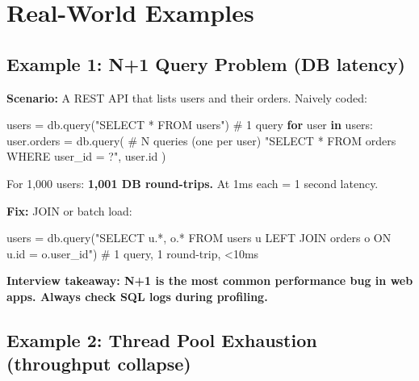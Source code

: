\documentclass[11pt]{article}
\newenvironment{Shaded}{\begin{snugshade}}{\end{snugshade}}
\newcommand{\BuiltInTok}[1]{\textcolor[rgb]{0.50,0.55,0.55}{#1}}
\newcommand{\CommentTok}[1]{\textcolor[rgb]{0.48,0.49,0.49}{#1}}
\newcommand{\ControlFlowTok}[1]{\textcolor[rgb]{0.99,0.74,0.29}{\textbf{#1}}}
\newcommand{\KeywordTok}[1]{\textcolor[rgb]{0.81,0.81,0.76}{\textbf{#1}}}
\newcommand{\NormalTok}[1]{\textcolor[rgb]{0.81,0.81,0.76}{#1}}
\newcommand{\OperatorTok}[1]{\textcolor[rgb]{0.81,0.81,0.76}{#1}}
\newcommand{\StringTok}[1]{\textcolor[rgb]{0.96,0.31,0.31}{#1}}
\begin{document}
\section{Real-World Examples}\label{real-world-examples}

\subsection{Example 1: N+1 Query Problem (DB latency)}\label{example-1-n1-query-problem-db-latency}

\textbf{Scenario:} A REST API that lists users and their orders. Naively coded:


\begin{Shaded}
\begin{Highlighting}[]
\NormalTok{users }\OperatorTok{=}\NormalTok{ db.query(}\StringTok{"SELECT * FROM users"}\NormalTok{)          }\CommentTok{\# 1 query}
\ControlFlowTok{for}\NormalTok{ user }\KeywordTok{in}\NormalTok{ users:}
\NormalTok{    user.orders }\OperatorTok{=}\NormalTok{ db.query(                       }\CommentTok{\# N queries (one per user)}
        \StringTok{"SELECT * FROM orders WHERE user\_id = ?"}\NormalTok{,}
\NormalTok{        user.}\BuiltInTok{id}
\NormalTok{    )}
\end{Highlighting}
\end{Shaded}

For 1,000 users: \textbf{1,001 DB round-trips.} At 1ms each = 1 second latency.

\textbf{Fix:} JOIN or batch load:


\begin{Shaded}
\begin{Highlighting}[]
\NormalTok{users }\OperatorTok{=}\NormalTok{ db.query(}\StringTok{"SELECT u.*, o.* FROM users u LEFT JOIN orders o ON u.id = o.user\_id"}\NormalTok{)}
\CommentTok{\# 1 query, 1 round{-}trip, \textless{}10ms}
\end{Highlighting}
\end{Shaded}

\textbf{Interview takeaway: N+1 is the most common performance bug in web apps. Always check SQL logs during profiling.}

\subsection{Example 2: Thread Pool Exhaustion (throughput collapse)}\label{example-2-thread-pool-exhaustion-throughput-collapse}
\end{document}
